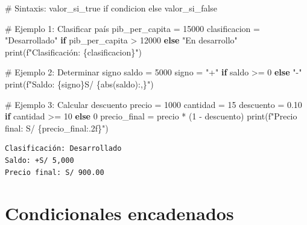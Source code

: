 \documentclass[
  doc,
  floatsintext,
  longtable,
  a4paper,
  nolmodern,
  notxfonts,
  notimes,
  12pt,
  colorlinks=true,linkcolor=blue,citecolor=blue,urlcolor=blue]{apa7}
\newenvironment{Shaded}{\begin{snugshade}}{\end{snugshade}}
\newcommand{\BuiltInTok}[1]{\textcolor[rgb]{0.00,0.23,0.31}{#1}}
\newcommand{\CommentTok}[1]{\textcolor[rgb]{0.37,0.37,0.37}{#1}}
\newcommand{\ControlFlowTok}[1]{\textcolor[rgb]{0.00,0.23,0.31}{\textbf{#1}}}
\newcommand{\DecValTok}[1]{\textcolor[rgb]{0.68,0.00,0.00}{#1}}
\newcommand{\FloatTok}[1]{\textcolor[rgb]{0.68,0.00,0.00}{#1}}
\newcommand{\NormalTok}[1]{\textcolor[rgb]{0.00,0.23,0.31}{#1}}
\newcommand{\OperatorTok}[1]{\textcolor[rgb]{0.37,0.37,0.37}{#1}}
\newcommand{\SpecialCharTok}[1]{\textcolor[rgb]{0.37,0.37,0.37}{#1}}
\newcommand{\SpecialStringTok}[1]{\textcolor[rgb]{0.13,0.47,0.30}{#1}}
\newcommand{\StringTok}[1]{\textcolor[rgb]{0.13,0.47,0.30}{#1}}
\begin{document}
\begin{Shaded}
\begin{Highlighting}[]
\CommentTok{\# Sintaxis: valor\_si\_true if condicion else valor\_si\_false}

\CommentTok{\# Ejemplo 1: Clasificar país}
\NormalTok{pib\_per\_capita }\OperatorTok{=} \DecValTok{15000}
\NormalTok{clasificacion }\OperatorTok{=} \StringTok{"Desarrollado"} \ControlFlowTok{if}\NormalTok{ pib\_per\_capita }\OperatorTok{\textgreater{}} \DecValTok{12000} \ControlFlowTok{else} \StringTok{"En desarrollo"}
\BuiltInTok{print}\NormalTok{(}\SpecialStringTok{f"Clasificación: }\SpecialCharTok{\{}\NormalTok{clasificacion}\SpecialCharTok{\}}\SpecialStringTok{"}\NormalTok{)}

\CommentTok{\# Ejemplo 2: Determinar signo}
\NormalTok{saldo }\OperatorTok{=} \DecValTok{5000}
\NormalTok{signo }\OperatorTok{=} \StringTok{"+"} \ControlFlowTok{if}\NormalTok{ saldo }\OperatorTok{\textgreater{}=} \DecValTok{0} \ControlFlowTok{else} \StringTok{"{-}"}
\BuiltInTok{print}\NormalTok{(}\SpecialStringTok{f"Saldo: }\SpecialCharTok{\{}\NormalTok{signo}\SpecialCharTok{\}}\SpecialStringTok{S/ }\SpecialCharTok{\{}\BuiltInTok{abs}\NormalTok{(saldo)}\SpecialCharTok{:,\}}\SpecialStringTok{"}\NormalTok{)}

\CommentTok{\# Ejemplo 3: Calcular descuento}
\NormalTok{precio }\OperatorTok{=} \DecValTok{1000}
\NormalTok{cantidad }\OperatorTok{=} \DecValTok{15}
\NormalTok{descuento }\OperatorTok{=} \FloatTok{0.10} \ControlFlowTok{if}\NormalTok{ cantidad }\OperatorTok{\textgreater{}=} \DecValTok{10} \ControlFlowTok{else} \DecValTok{0}
\NormalTok{precio\_final }\OperatorTok{=}\NormalTok{ precio }\OperatorTok{*}\NormalTok{ (}\DecValTok{1} \OperatorTok{{-}}\NormalTok{ descuento)}
\BuiltInTok{print}\NormalTok{(}\SpecialStringTok{f"Precio final: S/ }\SpecialCharTok{\{}\NormalTok{precio\_final}\SpecialCharTok{:.2f\}}\SpecialStringTok{"}\NormalTok{)}
\end{Highlighting}
\end{Shaded}

\begin{verbatim}
Clasificación: Desarrollado
Saldo: +S/ 5,000
Precio final: S/ 900.00
\end{verbatim}

\section{Condicionales encadenados}\label{condicionales-encadenados}
\end{document}
